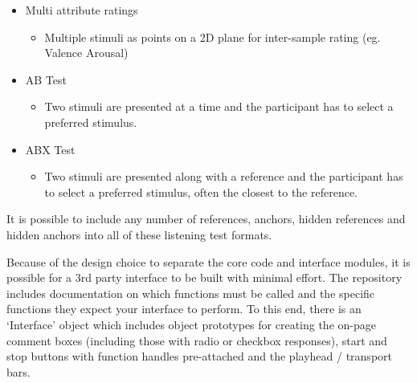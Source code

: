 \documentclass{sig-alternate}
\begin{document}
\begin{itemize}[noitemsep,nolistsep]
		\item Multi attribute ratings
		\begin{itemize}[noitemsep,nolistsep]
			\item Multiple stimuli as points on a 2D plane for inter-sample rating (eg. Valence Arousal)
		\end{itemize}
		\item AB Test~\cite{lipshitz1981great}
		\begin{itemize}[noitemsep,nolistsep]
			\item Two stimuli are presented at a time and the participant has to select a preferred stimulus.
		\end{itemize}
		\item ABX Test~\cite{clark1982high}
		\begin{itemize}[noitemsep,nolistsep]
			\item Two stimuli are presented along with a reference and the participant has to select a preferred stimulus, often the closest to the reference.
		\end{itemize}
	\end{itemize}
	
	It is possible to include any number of references, anchors, hidden references and hidden anchors into all of these listening test formats.
	
	Because of the design choice to separate the core code and interface modules, it is possible for a 3rd party interface to be built with minimal effort. The repository includes documentation on which functions must be called and the specific functions they expect your interface to perform. To this end, there is an `Interface' object which includes object prototypes for creating the on-page comment boxes (including those with radio or checkbox responses), start and stop buttons with function handles pre-attached and the playhead / transport bars.
	
\end{document}
